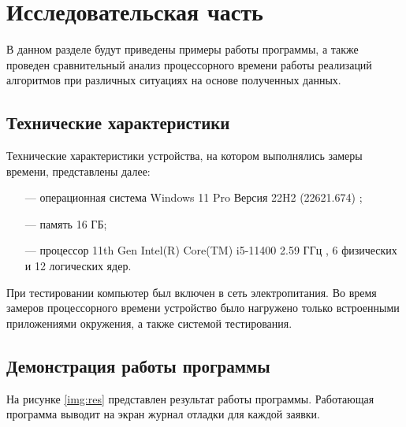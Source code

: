 \chapter{Исследовательская часть}

В данном разделе будут приведены примеры работы программы, а также проведен сравнительный анализ процессорного времени работы реализаций алгоритмов при различных ситуациях на основе полученных данных.

\section{Технические характеристики}

Технические характеристики устройства, на котором выполнялись замеры времени, представлены далее:

\begin{itemize}[itemindent=1.25em]
	\item[---] операционная система Windows 11 Pro Версия 22H2 (22621.674) \cite{wind};
	\item[---] память 16 ГБ;
	\item[---] процессор 11th Gen Intel(R) Core(TM) i5-11400 2.59 ГГц \cite{proc}, 6 физических и 12 логических ядер.
\end{itemize}

При тестировании компьютер был включен в сеть электропитания. Во время замеров процессорного времени устройство было нагружено только встроенными приложениями окружения, а также системой тестирования.

\section{Демонстрация работы программы}

На рисунке \ref{img:res} представлен результат работы программы. Работающая программа выводит на экран журнал отладки для каждой заявки.
\begin{center}
	\label{img:res}
\end{center}

